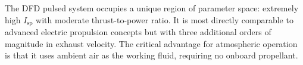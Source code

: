 \documentclass[amsmath,amssymb,aps,prd,superscriptaddress,nofootinbib]{revtex4-2}
\begin{document}
The DFD pulsed system occupies a unique region of parameter space:
extremely high $I_\text{sp}$ with moderate thrust-to-power ratio. It is
most directly comparable to advanced electric propulsion concepts but
with three additional orders of magnitude in exhaust velocity. The
critical advantage for atmospheric operation is that it uses ambient
air as the working fluid, requiring no onboard propellant.
\end{document}
